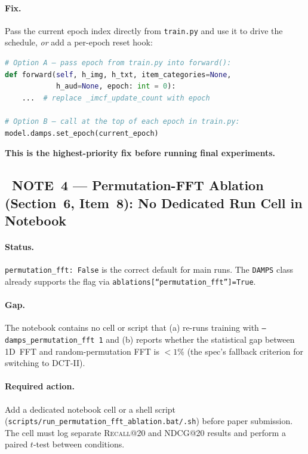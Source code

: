 \documentclass[12pt,a4paper]{article}
\newcommand{\INFO}{\textcolor{infoblue}{\ding{117}~\textbf{NOTE}}}
\begin{document}
\paragraph{Fix.}
Pass the current epoch index directly from \texttt{train.py} and use it to
drive the schedule, \emph{or} add a per-epoch reset hook:

\begin{lstlisting}[language=Python]
# Option A — pass epoch from train.py into forward():
def forward(self, h_img, h_txt, item_categories=None,
            h_aud=None, epoch: int = 0):
    ...  # replace _imcf_update_count with epoch

# Option B — call at the top of each epoch in train.py:
model.damps.set_epoch(current_epoch)
\end{lstlisting}

\textbf{This is the highest-priority fix before running final experiments.}

\subsection[\INFO{} 4 --- Permutation-FFT Ablation Workflow Missing]
           {\INFO~4 --- Permutation-FFT Ablation (Section~6, Item~8): No Dedicated Run Cell in Notebook}

\paragraph{Status.}
\texttt{permutation\_fft: False} is the correct default for main runs.
The \texttt{DAMPS} class already supports the flag via
\texttt{ablations[``permutation\_fft'']=True}.

\paragraph{Gap.}
The notebook contains no cell or script that (a) re-runs training with
\texttt{--damps\_permutation\_fft 1} and (b) reports whether the statistical
gap between 1D~FFT and random-permutation FFT is $< 1\%$ (the spec's fallback
criterion for switching to DCT-II).

\paragraph{Required action.}
Add a dedicated notebook cell or a shell script
(\texttt{scripts/run\_permutation\_fft\_ablation.bat/.sh}) before paper
submission.  The cell must log separate \textsc{Recall@20} and
\textsc{NDCG@20} results and perform a paired $t$-test between conditions.
\end{document}
